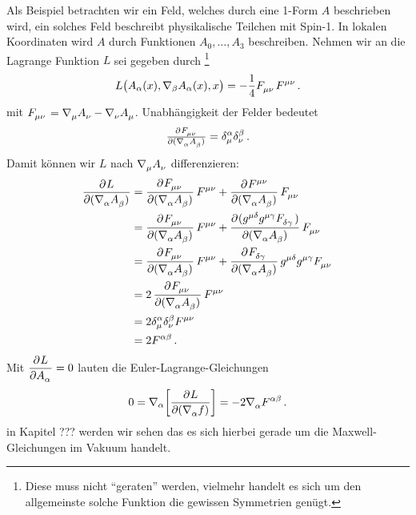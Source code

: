  \begin{beispiel} \label{bsp:Spinone}
Als Beispiel betrachten wir ein Feld, welches durch eine
1-Form $A$ beschrieben wird, ein solches Feld beschreibt physikalische Teilchen
mit Spin-1.
In lokalen Koordinaten wird $A$ durch Funktionen $A_0,\dots,A_3$ beschreiben. Nehmen wir an die Lagrange
Funktion $L$ sei gegeben durch \footnote{Diese muss nicht "`geraten"'
werden, vielmehr handelt es sich um den allgemeinste solche Funktion die
gewissen Symmetrien genügt. }
\begin{equation}
L\left(A_\alpha(x),\nabla_\beta
A_\alpha(x),x\right)=-\frac{1}{4}\tensor{F}{_\mu_\nu}\tensor{F}{^\mu^\nu}\,.
\end{equation}
mit
$\tensor{F}{_\mu_\nu}=\tensor{\nabla}{_\mu}\tensor{A}{_\nu}-\tensor{\nabla}{_\nu}\tensor{A}{_\mu}$.
Unabhängigkeit der Felder bedeutet
\begin{equation}
\pd{\tensor{F}{_\mu_\nu}}{(\tensor{\nabla}{_\alpha}\tensor{A}{_\beta})}
=\tensor*{\delta}{^\alpha_\mu}\tensor*{\delta}{^\beta_\nu}\,.
\end{equation}
Damit können wir $L$ nach $\tensor{\nabla}{_\mu}\tensor{A}{_\nu}$
differenzieren:
\begin{equation}
\begin{split}
\dpd{L}{(\tensor{\nabla}{_\alpha}\tensor{A}{_\beta})}
&=\dpd{\tensor{F}{_\mu_\nu}}{(\tensor{\nabla}{_\alpha}\tensor{A}{_\beta})}\tensor{F}{^\mu^\nu}
+\dpd{\tensor{F}{^\mu^\nu}}{(\tensor{\nabla}{_\alpha}\tensor{A}{_\beta})}\tensor{F}{_\mu_\nu}
\\
&=\dpd{\tensor{F}{_\mu_\nu}}{(\tensor{\nabla}{_\alpha}\tensor{A}{_\beta})}\tensor{F}{^\mu^\nu}
+\dpd{(\tensor{g}{^\mu^\delta}\tensor{g}{^\mu^\gamma}\tensor{F}{_\delta_\gamma})}{(\tensor{\nabla}{_\alpha}\tensor{A}{_\beta})}\tensor{F}{_\mu_\nu}
\\
&=\dpd{\tensor{F}{_\mu_\nu}}{(\tensor{\nabla}{_\alpha}\tensor{A}{_\beta})}\tensor{F}{^\mu^\nu}
+\dpd{\tensor{F}{_\delta_\gamma}}{(\tensor{\nabla}{_\alpha}\tensor{A}{_\beta})}\tensor{g}{^\mu^\delta}\tensor{g}{^\mu^\gamma}\tensor{F}{_\mu_\nu}
\\
&=2\dpd{\tensor{F}{_\mu_\nu}}{(\tensor{\nabla}{_\alpha}\tensor{A}{_\beta})}\tensor{F}{^\mu^\nu}\\
&=2\tensor*{\delta}{^\alpha_\mu}\tensor*{\delta}{^\beta_\nu}\tensor{F}{^\mu^\nu}\\
&=2\tensor{F}{^\alpha^\beta}\,.
\end{split}
\end{equation}
Mit $\dpd{L}{\tensor{A}{_\alpha}}=0$ lauten die Euler-Lagrange-Gleichungen
\begin{equation}
0=\nabla_\alpha\left[\dpd{L}{\left(\tensor{\nabla}{_\alpha}f\right)}\right]
=-2\tensor{\nabla}{_\alpha}\tensor{F}{^\alpha^\beta}\,.
\end{equation}
in Kapitel ??? werden wir sehen das es sich hierbei gerade um die
Maxwell-Gleichungen im Vakuum handelt.
\end{beispiel}
